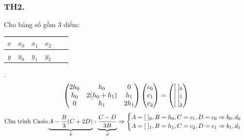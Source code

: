 \documentclass[12pt, a4paper]{report}
\begin{document}
\subsubsection{TH2.} Cho bảng số gồm 3 diểm: \begin{tabular}{c|ccccc}
    $x$ & $x_0$ & $x_1$ & $x_2$ \\ \hline
    $y$ & $y_0$ & $y_1$ & $y_2$  
    \end{tabular}.
\[
    \begin{pmatrix}
        2h_0 & h_0 & 0 \\
        h_0 & 2(h_0 + h_1) & h_1 \\
        0 & h_1 & 2h_1 
        \end{pmatrix}   \begin{pmatrix}
            c_0 \\
            c_1 \\ 
            c_2
        \end{pmatrix}  = \begin{pmatrix}
            \lbrack \thickspace \rbrack_0 \\
            \lbrack \thickspace \rbrack_1 \\ 
            \lbrack \thickspace \rbrack_2
        \end{pmatrix}  
\]
\[
    \text{Chu trình Casio} \underbrace{A - \frac{B}{3}(C+2D)}_{b} : \underbrace{\frac{C - D}{3B}}_{d} \Rightarrow \begin{cases}
        A = \lbrack \thickspace \rbrack_0, B = h_0, C = c_1, D = c_0 \Rightarrow b_0,d_0 \\
        A = \lbrack \thickspace \rbrack_1, B = h_1, C = c_2, D = c_1 \Rightarrow b_1,d_1
    \end{cases}
\]
\end{document}
